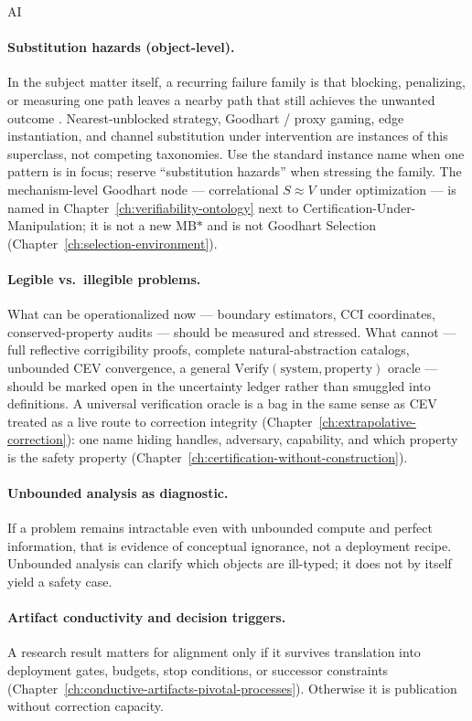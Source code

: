 \begin{authbar}{AI}
\paragraph{Substitution hazards (object-level).}
In the subject matter itself, a recurring failure family is that blocking, penalizing, or measuring one path leaves a nearby path that still achieves the unwanted outcome \autocite{yudkowskynearestunblocked,manheim2018goodhart,goodhart1984problems}.
Nearest-unblocked strategy, Goodhart / proxy gaming, edge instantiation, and channel substitution under intervention are instances of this superclass, not competing taxonomies.
Use the standard instance name when one pattern is in focus; reserve ``substitution hazards'' when stressing the family.
The mechanism-level Goodhart node --- correlational $S\approx V$ under optimization --- is named in Chapter~\ref{ch:verifiability-ontology} next to Certification-Under-Manipulation; it is not a new $\text{MB*}$ and is not Goodhart Selection (Chapter~\ref{ch:selection-environment}).

\paragraph{Legible vs.\ illegible problems.}
What can be operationalized now --- boundary estimators, CCI coordinates, conserved-property audits --- should be measured and stressed.
What cannot --- full reflective corrigibility proofs, complete natural-abstraction catalogs, unbounded CEV convergence, a general $\mathrm{Verify}(\text{system},\text{property})$ oracle --- should be marked open in the uncertainty ledger rather than smuggled into definitions.
A universal verification oracle is a bag in the same sense as CEV treated as a live route to correction integrity (Chapter~\ref{ch:extrapolative-correction}): one name hiding handles, adversary, capability, and which property is the safety property (Chapter~\ref{ch:certification-without-construction}).

\paragraph{Unbounded analysis as diagnostic.}
If a problem remains intractable even with unbounded compute and perfect information, that is evidence of conceptual ignorance, not a deployment recipe.
Unbounded analysis can clarify which objects are ill-typed; it does not by itself yield a safety case.

\paragraph{Artifact conductivity and decision triggers.}
A research result matters for alignment only if it survives translation into deployment gates, budgets, stop conditions, or successor constraints (Chapter~\ref{ch:conductive-artifacts-pivotal-processes}).
Otherwise it is publication without correction capacity.


\end{authbar}
